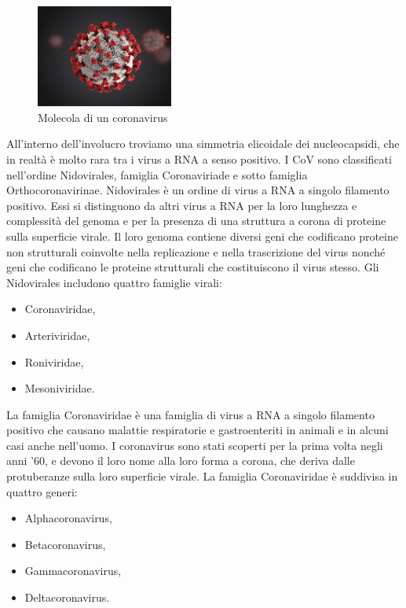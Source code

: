 \begin{figure}
	\centering
	\includegraphics[width=0.4\textwidth]{Immagini/coronavirus.png}
	\caption{Molecola di un coronavirus}
	\label{fig:Amminoacido}
\end{figure}

All'interno dell'involucro troviamo una simmetria elicoidale dei nucleocapsidi, che in realtà è molto rara tra i virus a RNA a senso positivo. I CoV sono classificati nell'ordine Nidovirales, famiglia Coronaviriade e sotto famiglia Orthocoronavirinae. Nidovirales è un ordine di virus a RNA a singolo filamento positivo. Essi si distinguono da altri virus a RNA per la loro lunghezza e complessità del genoma e per la presenza di una struttura a corona di proteine sulla superficie virale. Il loro genoma contiene diversi geni che codificano proteine non strutturali coinvolte nella replicazione e nella trascrizione del virus nonché geni che codificano le proteine strutturali che costituiscono il virus stesso. Gli Nidovirales includono quattro famiglie virali:
\vspace{10pt}
\begin{itemize}
	\item Coronaviridae,
	\vspace{5pt}
	\item Arteriviridae,
	\vspace{5pt}
	\item Roniviridae,
	\vspace{5pt}
	\item Mesoniviridae.
\end{itemize}

La famiglia Coronaviridae è una famiglia di virus a RNA a singolo filamento positivo che causano malattie respiratorie e gastroenteriti in animali e in alcuni casi anche nell'uomo. I coronavirus sono stati scoperti per la prima volta negli anni '60, e devono il loro nome alla loro forma a corona, che deriva dalle protuberanze sulla loro superficie virale. La famiglia Coronaviridae è suddivisa in quattro generi:
\vspace{10pt}
\begin{itemize}
	\item Alphacoronavirus,
	\vspace{5pt}
	\item Betacoronavirus,
	\vspace{5pt}
	\item Gammacoronavirus,
	\vspace{5pt}
	\item Deltacoronavirus.
\end{itemize}

